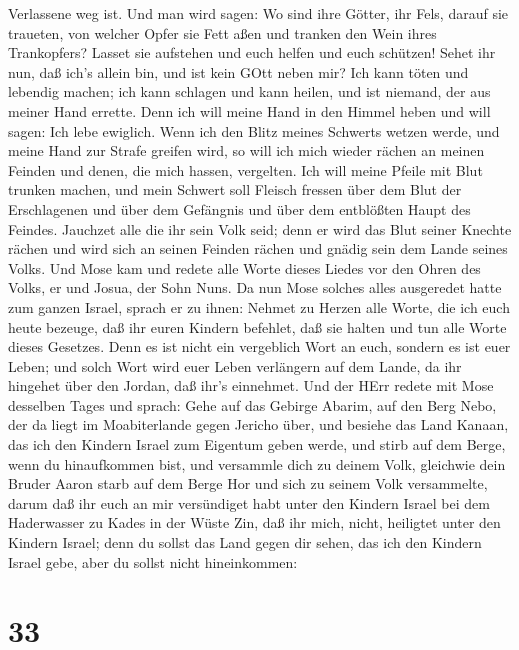 Verlassene weg ist.  Und man wird sagen: Wo sind ihre
Götter, ihr Fels, darauf sie traueten,  von welcher Opfer
sie Fett aßen und tranken den Wein ihres Trankopfers? Lasset sie
aufstehen und euch helfen und euch schützen!  Sehet ihr
nun, daß ich's allein bin, und ist kein GOtt neben mir? Ich kann töten
und lebendig machen; ich kann schlagen und kann heilen, und ist niemand,
der aus meiner Hand errette.  Denn ich will meine Hand in
den Himmel heben und will sagen: Ich lebe ewiglich.  Wenn
ich den Blitz meines Schwerts wetzen werde, und meine Hand zur Strafe
greifen wird, so will ich mich wieder rächen an meinen Feinden und
denen, die mich hassen, vergelten.  Ich will meine Pfeile
mit Blut trunken machen, und mein Schwert soll Fleisch fressen über dem
Blut der Erschlagenen und über dem Gefängnis und über dem entblößten
Haupt des Feindes.  Jauchzet alle die ihr sein Volk seid;
denn er wird das Blut seiner Knechte rächen und wird sich an seinen
Feinden rächen und gnädig sein dem Lande seines Volks.  Und
Mose kam und redete alle Worte dieses Liedes vor den Ohren des Volks, er
und Josua, der Sohn Nuns.  Da nun Mose solches alles
ausgeredet hatte zum ganzen Israel,  sprach er zu ihnen:
Nehmet zu Herzen alle Worte, die ich euch heute bezeuge, daß ihr euren
Kindern befehlet, daß sie halten und tun alle Worte dieses Gesetzes.
 Denn es ist nicht ein vergeblich Wort an euch, sondern es
ist euer Leben; und solch Wort wird euer Leben verlängern auf dem Lande,
da ihr hingehet über den Jordan, daß ihr's einnehmet.  Und
der HErr redete mit Mose desselben Tages und sprach:  Gehe
auf das Gebirge Abarim, auf den Berg Nebo, der da liegt im Moabiterlande
gegen Jericho über, und besiehe das Land Kanaan, das ich den Kindern
Israel zum Eigentum geben werde,  und stirb auf dem Berge,
wenn du hinaufkommen bist, und versammle dich zu deinem Volk, gleichwie
dein Bruder Aaron starb auf dem Berge Hor und sich zu seinem Volk
versammelte,  darum daß ihr euch an mir versündiget habt
unter den Kindern Israel bei dem Haderwasser zu Kades in der Wüste Zin,
daß ihr mich, nicht, heiligtet unter den Kindern Israel; 
denn du sollst das Land gegen dir sehen, das ich den Kindern Israel
gebe, aber du sollst nicht hineinkommen:

\hypertarget{section-32}{%
\section{33}\label{section-32}}

